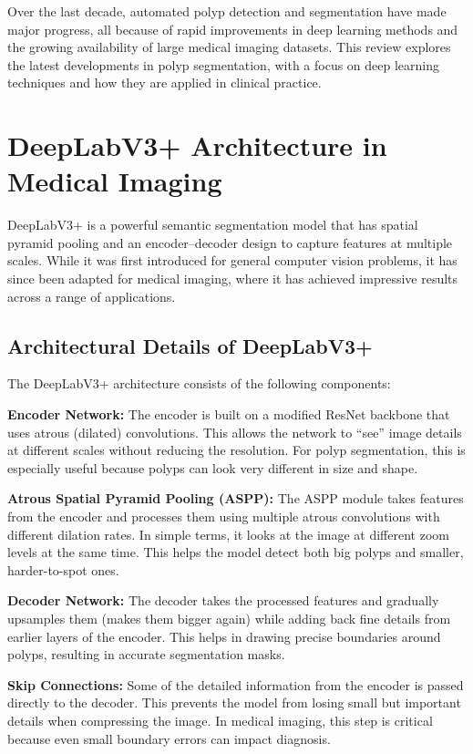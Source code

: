 \documentclass[a4paper,12pt]{report}
\begin{document}
Over the last decade, automated polyp detection and segmentation have made major progress, all because of rapid improvements in deep learning methods and the growing availability of large medical imaging datasets. This review explores the latest developments in polyp segmentation, with a focus on deep learning techniques and how they are applied in clinical practice.

   \section{DeepLabV3+ Architecture in Medical Imaging}
DeepLabV3+ is a powerful semantic segmentation model that has spatial pyramid pooling and an encoder–decoder design to capture features at multiple scales. While it was first introduced for general computer vision problems, it has since been adapted for medical imaging, where it has achieved impressive results across a range of applications.

\subsection{Architectural Details of DeepLabV3+}
   The DeepLabV3+ architecture consists of the following components: 


\textbf{Encoder Network:} The encoder is built on a modified ResNet backbone that uses atrous (dilated) convolutions. This allows the network to “see” image details at different scales without reducing the resolution. For polyp segmentation, this is especially useful because polyps can look very different in size and shape.


\textbf{Atrous Spatial Pyramid Pooling (ASPP):} The ASPP module takes features from the encoder and processes them using multiple atrous convolutions with different dilation rates. In simple terms, it looks at the image at different zoom levels at the same time. This helps the model detect both big polyps and smaller, harder-to-spot ones.


\textbf{Decoder Network:} The decoder takes the processed features and gradually upsamples them (makes them bigger again) while adding back fine details from earlier layers of the encoder. This helps in drawing precise boundaries around polyps, resulting in accurate segmentation masks.

\textbf{Skip Connections:} Some of the detailed information from the encoder is passed directly to the decoder. This prevents the model from losing small but important details when compressing the image. In medical imaging, this step is critical because even small boundary errors can impact diagnosis.
\end{document}

